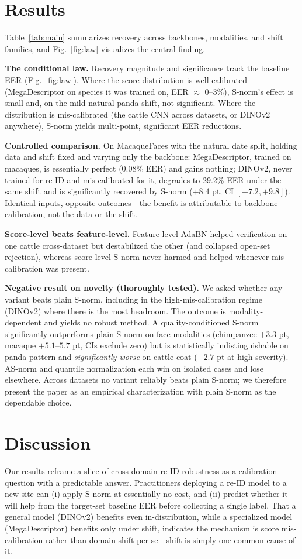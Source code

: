 \documentclass[conference]{IEEEtran}
\begin{document}
\section{Results}
Table~\ref{tab:main} summarizes recovery across backbones, modalities, and shift families, and
Fig.~\ref{fig:law} visualizes the central finding.

\textbf{The conditional law.} Recovery magnitude and significance track the baseline EER
(Fig.~\ref{fig:law}). Where the
score distribution is well-calibrated (MegaDescriptor on species it was trained on, EER $\approx$
0--3\%), S-norm's effect is small and, on the mild natural panda shift, not significant. Where the
distribution is mis-calibrated (the cattle CNN across datasets, or DINOv2 anywhere), S-norm yields
multi-point, significant EER reductions.

\textbf{Controlled comparison.} On MacaqueFaces with the natural date split, holding data and shift
fixed and varying only the backbone: MegaDescriptor, trained on macaques, is essentially perfect
(0.08\% EER) and gains nothing; DINOv2, never trained for re-ID and mis-calibrated for it, degrades
to 29.2\% EER under the same shift and is significantly recovered by S-norm ($+8.4$ pt, CI
$[+7.2,+9.8]$). Identical inputs, opposite outcomes---the benefit is attributable to backbone
calibration, not the data or the shift.

\textbf{Score-level beats feature-level.} Feature-level AdaBN helped verification on one cattle
cross-dataset but destabilized the other (and collapsed open-set rejection), whereas score-level
S-norm never harmed and helped whenever mis-calibration was present.

\textbf{Negative result on novelty (thoroughly tested).} We asked whether any variant beats plain
S-norm, including in the high-mis-calibration regime (DINOv2) where there is the most headroom. The
outcome is modality-dependent and yields no robust method. A quality-conditioned S-norm significantly
outperforms plain S-norm on face modalities (chimpanzee $+3.3$ pt, macaque $+5.1$--$5.7$ pt, CIs
exclude zero) but is statistically indistinguishable on panda pattern and \emph{significantly worse}
on cattle coat ($-2.7$ pt at high severity). AS-norm and quantile normalization each win on isolated
cases and lose elsewhere. Across datasets no variant reliably beats plain S-norm; we therefore
present the paper as an empirical characterization with plain S-norm as the dependable choice.

\section{Discussion}
Our results reframe a slice of cross-domain re-ID robustness as a calibration question with a
predictable answer. Practitioners deploying a re-ID model to a new site can (i) apply S-norm at
essentially no cost, and (ii) predict whether it will help from the target-set baseline EER before
collecting a single label. That a general model (DINOv2) benefits even in-distribution, while a
specialized model (MegaDescriptor) benefits only under shift, indicates the mechanism is score
mis-calibration rather than domain shift per se---shift is simply one common cause of it.
\end{document}
